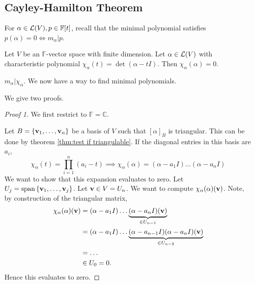 \documentclass[a4paper,11pt]{article}
\begin{document}
\subsection{Cayley-Hamilton Theorem}
For $ \alpha\in {\mathcal{L}}(V), p\in \mathbb{F}[t] $, recall that the minimal polynomial satisfies $ p(\alpha) = 0 \iff m_\alpha | p $. 

\begin{theorem}
	Let $V$ be an $\mathbb{F}$-vector space with finite dimension. Let $\alpha\in {\mathcal{L}}(V)$ with characteristic polynomial $ \chi_\alpha(t) = \det (\alpha - t I). $
	Then $ \chi_\alpha(\alpha) = 0 $. 
\end{theorem}
\begin{corollary}
	$ m_\alpha | \chi_\alpha $. We now have a way to find minimal polynomials.
\end{corollary}
We give two proofs. 
\begin{proof}[Proof 1]
	We first restrict to $ \mathbb{F} = \mathbb{C} $. 
	
	Let $ B = \qty{{\bf v}_1, \dots, {\bf v}_n} $ be a basis of $ V $ such that $ [\alpha]_B $ is triangular. This can be done by theorem \ref{thm:test if triangulable}. If the diagonal entries in this basis are $ a_i $,
	\[
		\chi_\alpha(t) = \prod_{i=1}^n (a_i - t) \implies \chi_\alpha(\alpha) = (\alpha - a_1 I) \dots (\alpha - a_n I)
	\]
	We want to show that this expansion evaluates to zero.
	Let $ U_j = \operatorname{span} \qty{{\bf v}_1, \dots, {\bf v}_j} $.
	Let $ {\bf v} \in V = U_n $.
	We want to compute $ \chi_\alpha(\alpha)({\bf v}) $.
	Note, by construction of the triangular matrix,
	\begin{align*}
		\chi_\alpha(\alpha)({\bf v}) & = (\alpha - a_1 I) \dots \underbrace{(\alpha - a_n I)({\bf v})}_{\in U_{n-1}}                     \\
		                       & = (\alpha - a_1 I) \dots \underbrace{(\alpha - a_{n-1} I)(\alpha - a_n I)({\bf v})}_{\in U_{n-2}} \\
		                       & = \dots                                                                                     \\
		                       & \in U_0 = 0. 
	\end{align*}
	Hence this evaluates to zero.
\end{proof}
\end{document}
